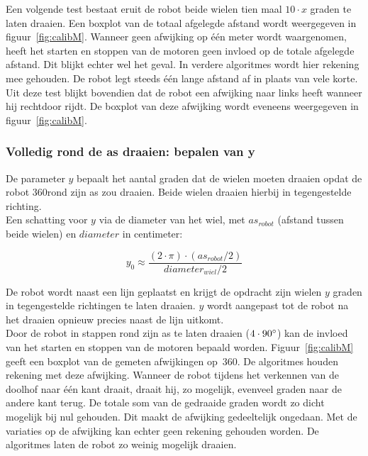 \documentclass[tt3]{penoverslag}
\begin{document}
Een volgende test bestaat eruit de robot beide wielen tien maal $10 \cdot x$ graden te laten draaien. Een boxplot van de totaal afgelegde afstand wordt weergegeven in figuur~\ref{fig:calibM}. Wanneer geen afwijking op \'e\'en meter wordt waargenomen, heeft het starten en stoppen van de motoren geen invloed op de totale afgelegde afstand. Dit blijkt echter wel het geval. In verdere algoritmes wordt hier rekening mee gehouden. De robot legt steeds \'e\'en lange afstand af in plaats van vele korte.\\
Uit deze test blijkt bovendien dat de robot een afwijking naar links heeft wanneer hij rechtdoor rijdt. De boxplot van deze afwijking wordt eveneens weergegeven in figuur~\ref{fig:calibM}.


\subsubsection{Volledig rond de as draaien: bepalen van y} %
\label{ssec:calibMy}
De parameter $y$ bepaalt het aantal graden dat de wielen moeten draaien opdat de robot 360\degree rond zijn as zou draaien. Beide wielen draaien hierbij in tegengestelde richting.\\
Een schatting voor $y$ via de diameter van het wiel, met $as_{robot}$ (afstand tussen beide wielen) en $diameter$ in centimeter:

\begin{equation*}
y_{0} \approx \frac{(2 \cdot \pi) \cdot (as_{robot}/2)}{diameter_{wiel}/2}
\end{equation*}

De robot wordt naast een lijn geplaatst en krijgt de opdracht zijn wielen $y$ graden in tegengestelde richtingen te laten draaien. $y$ wordt aangepast tot de robot na het draaien opnieuw precies naast de lijn uitkomt.\\


Door de robot in stappen rond zijn as te laten draaien ($4 \cdot 90\degree$) kan de invloed van het starten en stoppen van de motoren bepaald worden. Figuur~\ref{fig:calibM} geeft een boxplot van de gemeten afwijkingen op~360\degree. De algoritmes houden rekening met deze afwijking. Wanneer de robot tijdens het verkennen van de doolhof naar \'e\'en kant draait, draait hij, zo mogelijk, evenveel graden naar de andere kant terug. De totale som van de gedraaide graden wordt zo dicht mogelijk bij nul gehouden. Dit maakt de afwijking gedeeltelijk ongedaan. Met de variaties op de afwijking kan echter geen rekening gehouden worden. De algoritmes laten de robot zo weinig mogelijk draaien.
\end{document}
